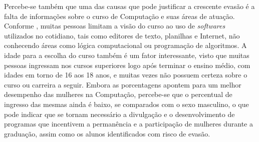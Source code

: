 Percebe-se também que uma das causas que pode justificar a crescente evasão é a falta de informações sobre o curso de Computação e suas áreas de atuação. Conforme \citet{prietch_pazeto2010}, muitas pessoas limitam a visão do curso ao uso de \textit{softwares} utilizados no cotidiano, tais como editores de texto, planilhas e Internet, não conhecendo áreas como lógica computacional ou programação de algoritmos. A idade para a escolha do curso também é um fator interessante, visto que muitas pessoas ingressam nos cursos superiores logo após terminar o ensino médio, com idades em torno de 16 aos 18 anos, e muitas vezes não possuem certeza sobre o curso ou carreira a seguir. Embora as porcentagens apontem para um melhor desempenho das mulheres na Computação, percebe-se que o percentual de ingresso das mesmas ainda é baixo, se comparados com o sexo masculino, o que pode indicar que se tornam necessário a divulgação e o desenvolvimento de programas que incentivem a permanência e a participação de mulheres durante a graduação, assim como os alunos identificados com risco de evasão. 